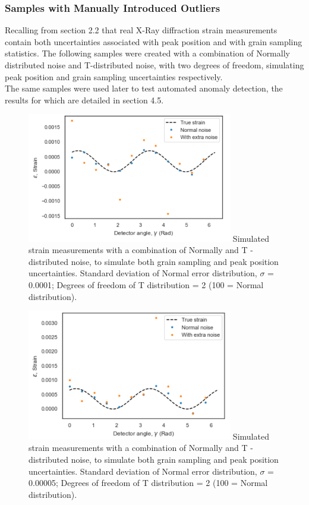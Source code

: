 \subsubsection{Samples with Manually Introduced Outliers}

Recalling from section 2.2 that real X-Ray diffraction strain measurements contain both uncertainties associated with peak position and with grain sampling statistics. The following samples were created with a combination of Normally distributed noise and T-distributed noise, with two degrees of freedom, simulating peak position and grain sampling uncertainties respectively.\\

The same samples were used later to test automated anomaly detection, the results for which are detailed in section 4.5.


  \begin{figure}[H]
 	\centering
 	\includegraphics[width=0.8\textwidth]{chapters/chapter02/fig02/sample9.png}
 	\mycaption
 	{Simulated strain measurements with a combination of Normally and T - distributed noise, to simulate both grain sampling and peak position uncertainties. Standard deviation of Normal error distribution, $\sigma$ = 0.0001; Degrees of freedom of T distribution = 2 (100 = Normal distribution).}
    \label{fig:RHP02}
 \end{figure}
 
   \begin{figure}[H]
 	\centering
 	\includegraphics[width=0.8\textwidth]{chapters/chapter02/fig02/s10.png}
 	\mycaption
 	{Simulated strain measurements with a combination of Normally and T - distributed noise, to simulate both grain sampling and peak position uncertainties. Standard deviation of Normal error distribution, $\sigma$ = 0.00005; Degrees of freedom of T distribution = 2 (100 = Normal distribution).}
    \label{fig:RHP02}
 \end{figure}

